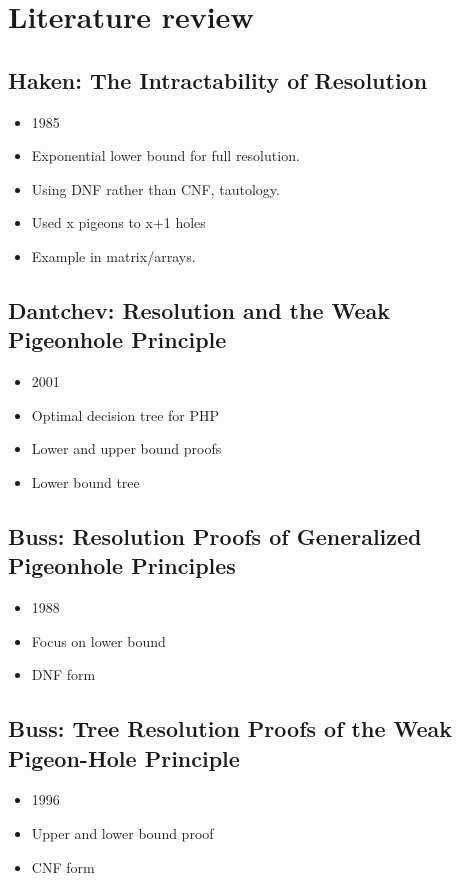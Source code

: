 \documentclass{report}
\begin{document}
\chapter{Literature review}
\label{cha:Literature}

\section{Haken: The Intractability of Resolution}
\label{sec:Haken1985Intractability}
\begin{itemize}
  \item 1985
  \item Exponential lower bound for full resolution.
  \item Using DNF rather than CNF, tautology.
  \item Used x pigeons to x+1 holes
  \item Example in matrix/arrays.
\end{itemize}
  \cite{Haken1985Intractability}

\section{Dantchev: Resolution and the Weak Pigeonhole Principle}
\label{sec:DantchevTreePHP}
\begin{itemize}
  \item 2001
  \item Optimal decision tree for PHP
  \item Lower and upper bound proofs
  \item Lower bound tree
\end{itemize} 
\cite{DantchevTreePHP}

\section{Buss: Resolution Proofs of Generalized Pigeonhole Principles}
\label{sec:Buss88GeneralProof}
\begin{itemize}
  \item 1988
  \item Focus on lower bound
  \item DNF form
\end{itemize}
\cite{Buss88GeneralProof}

\section{Buss: Tree Resolution Proofs of the Weak Pigeon-Hole Principle}
\label{sec:Buss96resolution}
\begin{itemize}
  \item 1996
  \item Upper and lower bound proof
  \item CNF form
\end{itemize}
\cite{Buss96resolution}
\end{document}
